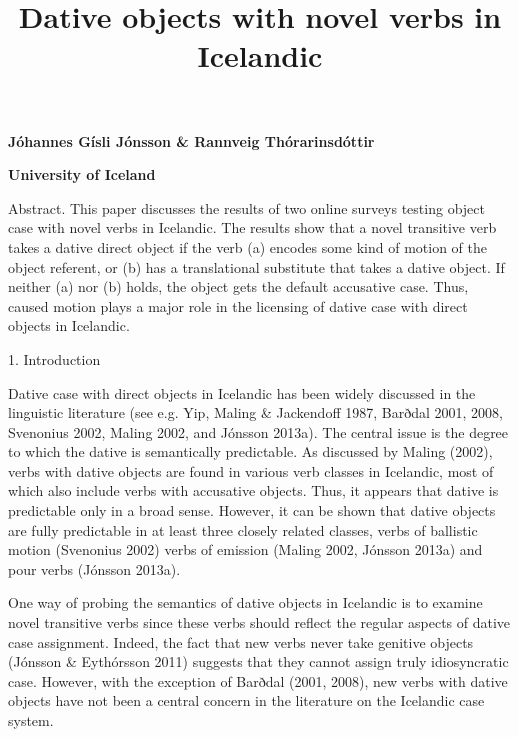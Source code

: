 
\title{Dative objects with novel verbs in Icelandic }
\maketitle

\begin{styleStandard}
\textbf{Jóhannes Gísli Jónsson \& Rannveig Thórarinsdóttir}
\end{styleStandard}

\begin{styleStandard}
\textbf{University of Iceland}
\end{styleStandard}

\begin{stylelsAbstract}
Abstract. This paper discusses the results of two online surveys testing object case with novel verbs in Icelandic. The results show that a novel transitive verb takes a dative direct object if the verb (a) encodes some kind of motion of the object referent, or (b) has a translational substitute that takes a dative object. If neither (a) nor (b) holds, the object gets the default accusative case. Thus, caused motion plays a major role in the licensing of dative case with direct objects in Icelandic.
\end{stylelsAbstract}

\begin{stylelsSectioni}
1. Introduction
\end{stylelsSectioni}

\begin{styleStandard}
Dative case with direct objects in Icelandic has been widely discussed in the linguistic literature (see e.g. Yip, Maling \& Jackendoff 1987, Barðdal 2001, 2008, Svenonius 2002, Maling 2002, and Jónsson 2013a). The central issue is the degree to which the dative is semantically predictable. As discussed by Maling (2002), verbs with dative objects are found in various verb classes in Icelandic, most of which also include verbs with accusative objects. Thus, it appears that dative is predictable only in a broad sense. However, it can be shown that dative objects are fully predictable in at least three closely related classes, verbs of ballistic motion (Svenonius 2002) verbs of emission (Maling 2002, Jónsson 2013a) and pour verbs (Jónsson 2013a).
\end{styleStandard}

\begin{styleStandard}
One way of probing the semantics of dative objects in Icelandic is to examine novel transitive verbs since these verbs should reflect the regular aspects of dative case assignment. Indeed, the fact that new verbs never take genitive objects (Jónsson \& Eythórsson 2011) suggests that they cannot assign truly idiosyncratic case. However, with the exception of Barðdal (2001, 2008), new verbs with dative objects have not been a central concern in the literature on the Icelandic case system. 
\end{styleStandard}

